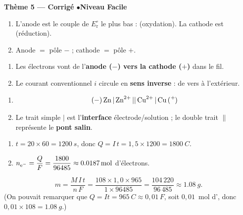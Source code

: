 \documentclass[11pt,a4paper]{article}
\begin{document}
\begin{center}\color{primarydark}\large\bfseries Thème 5 — Corrigé \quad$\bullet$\quad Niveau Facile\end{center}

\begin{corrige}
\begin{enumerate}[label=\alph*)]
  \item L'anode est le couple de $E_{\mathrm{r}}^{\circ}$ le plus bas :  (oxydation). La cathode
        est  (réduction).
  \item Anode $=$ pôle \textbf{$-$} ; cathode $=$ pôle \textbf{$+$}.
\end{enumerate}
\end{corrige}

\begin{corrige}
\begin{enumerate}[label=\alph*)]
  \item Les électrons vont de l'\textbf{anode  ($-$) vers la cathode  ($+$)} dans le fil.
  \item Le courant conventionnel $i$ circule en \textbf{sens inverse} : de  vers  à
        l'extérieur.
\end{enumerate}
\end{corrige}

\begin{corrige}
\begin{enumerate}[label=\alph*)]
  \item \[\ce{(-) Zn | Zn^{2+} || Cu^{2+} | Cu (+)}\]
  \item Le trait simple $|$ est l'\textbf{interface} électrode/solution ; le double trait $\big\|$
        représente le \textbf{pont salin}.
\end{enumerate}
\end{corrige}

\begin{corrige}
\begin{enumerate}[label=\alph*)]
  \item $t=20\times 60=\qty{1200}{s}$, donc $Q=I\,t=1{,}5\times 1200=\qty{1800}{C}$.
  \item $n_{\ce{e^-}}=\dfrac{Q}{F}=\dfrac{1800}{96485}\approx\qty{0.0187}{mol}$ d'électrons.
\end{enumerate}
\end{corrige}

\begin{corrige}
\[
m=\frac{M\,I\,t}{n\,F}=\frac{108\times 1{,}0\times 965}{1\times 96485}
=\frac{104\,220}{96\,485}\approx\qty{1.08}{g}.
\]
(On pouvait remarquer que $Q=It=\qty{965}{C}\approx 0{,}01\,F$, soit $0{,}01$~mol d', donc
$0{,}01\times 108=\qty{1.08}{g}$.)
\end{corrige}
\end{document}
